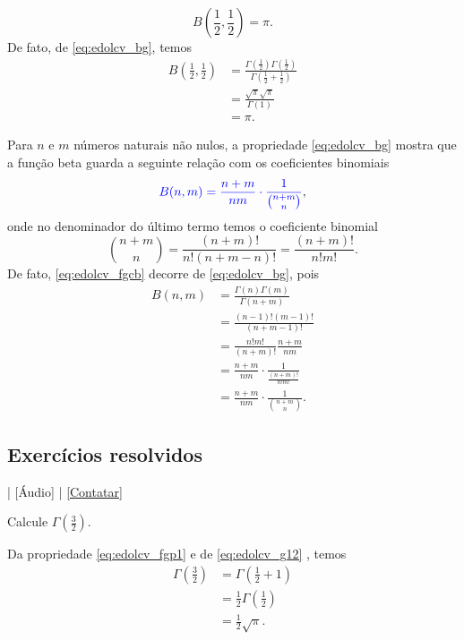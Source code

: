 \begin{ex}
  \begin{equation}
    B\left(\frac{1}{2}, \frac{1}{2}\right) = \pi.
  \end{equation}
  De fato, de \eqref{eq:edolcv_bg}, temos
  \begin{align}
    B\left(\frac{1}{2}, \frac{1}{2}\right) &= \frac{\Gamma\left(\frac{1}{2}\right)\Gamma\left(\frac{1}{2}\right)}{\Gamma\left(\frac{1}{2}+\frac{1}{2}\right)}\\
    &= \frac{\sqrt{\pi}\sqrt{\pi}}{\Gamma(1)}\\
    &= \pi.
  \end{align}
\end{ex}

Para $n$ e $m$ números naturais não nulos, a propriedade \eqref{eq:edolcv_bg} mostra que a função beta guarda a seguinte relação com os coeficientes binomiais
\begin{equation}\label{eq:edolcv_fgcb}
  {\color{blue}B(n,m) = \frac{n+m}{nm}\cdot \frac{1}{\binom{n+m}{n}}},
\end{equation}
onde no denominador do último termo temos o coeficiente binomial
\begin{equation}
  \binom{n+m}{n} = \frac{(n+m)!}{n!(n+m-n)!} = \frac{(n+m)!}{n!m!}.
\end{equation}
De fato, \eqref{eq:edolcv_fgcb} decorre de \eqref{eq:edolcv_bg}, pois
\begin{align}
  B(n,m) &= \frac{\Gamma(n)\Gamma(m)}{\Gamma(n+m)} \\
  &= \frac{(n-1)!(m-1)!}{(n+m-1)!}\\
  &= \frac{n!m!}{(n+m)!}\frac{n+m}{nm}\\
  &= \frac{n+m}{nm}\cdot\frac{1}{\frac{(n+m)!}{n!m!}}\\
  &= \frac{n+m}{nm}\cdot \frac{1}{\binom{n+m}{n}}.
\end{align}

\subsection*{Exercícios resolvidos}

\begin{flushright}
  [Vídeo] | [Áudio] | \href{https://phkonzen.github.io/notas/contato.html}{[Contatar]}
\end{flushright}

\begin{exeresol}
  Calcule $\displaystyle\Gamma\left(\frac{3}{2}\right)$.
\end{exeresol}
\begin{resol}
  Da propriedade \eqref{eq:edolcv_fgp1} e de \eqref{eq:edolcv_g12} , temos
  \begin{align}
    \Gamma\left(\frac{3}{2}\right) &= \Gamma\left(\frac{1}{2}+1\right)\\
    &= \frac{1}{2}\Gamma\left(\frac{1}{2}\right)\\
    &= \frac{1}{2}\sqrt{\pi}.
  \end{align}
\end{resol}

